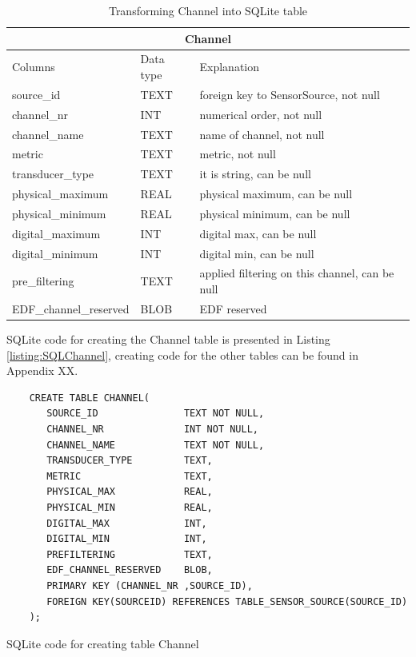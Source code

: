\begin{table}
\begin{center}
\begin{tabular}{ |p{4cm}|p{1.8cm}|p{6.2cm}|  }
 \hline
 \multicolumn{3}{|c|}{Channel} \\
 \hline
 Columns& Data type & Explanation \\
 \hline
 source\_id& TEXT& foreign key to SensorSource, not null\\
 channel\_nr& INT& numerical order, not null\\
 channel\_name& TEXT& name of channel, not null\\
 metric& TEXT& metric, not null\\
 transducer\_type& TEXT& it is string, can be null\\
 physical\_maximum& REAL& physical maximum, can be null\\
 physical\_minimum& REAL& physical minimum, can be null\\
 digital\_maximum& INT& digital max, can be null\\
 digital\_minimum& INT& digital min, can be null\\
 pre\_filtering& TEXT& applied filtering on this channel, can be null\\
 EDF\_channel\_reserved& BLOB& EDF reserved\\
 \hline
\end{tabular}
\end{center}
\caption{Transforming Channel into SQLite table}
\label{tab:ChannelTypeSQL}
\end{table}
SQLite code for creating the Channel table is presented in Listing \ref{listing:SQLChannel}, creating code for the other tables can be found in Appendix XX.
\begin{code}[ht]
\begin{lstlisting}
    CREATE TABLE CHANNEL(
	   SOURCE_ID               TEXT NOT NULL,
	   CHANNEL_NR              INT NOT NULL,
	   CHANNEL_NAME            TEXT NOT NULL,
	   TRANSDUCER_TYPE         TEXT,
	   METRIC                  TEXT,
	   PHYSICAL_MAX            REAL,
	   PHYSICAL_MIN            REAL,
	   DIGITAL_MAX             INT,
	   DIGITAL_MIN             INT,
	   PREFILTERING            TEXT,
	   EDF_CHANNEL_RESERVED    BLOB,
	   PRIMARY KEY (CHANNEL_NR ,SOURCE_ID),
       FOREIGN KEY(SOURCEID) REFERENCES TABLE_SENSOR_SOURCE(SOURCE_ID)
	);
\end{lstlisting}
\caption[SQLite code for creating table Channel]{SQLite code for creating table Channel}
\label{listing:SQLChannel}
\end{code}\\
